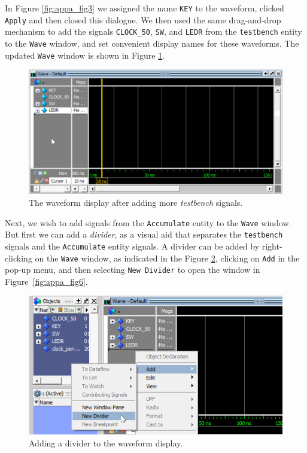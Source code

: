 \documentclass[11pt, twoside, pdftex]{article}
\begin{document}
\noindent
In Figure \ref{fig:appa_fig3} we assigned the name \texttt{KEY} to the waveform, clicked
\texttt{Apply} and then closed this dialogue. We then used the same drag-and-drop mechanism
to add the signals \texttt{CLOCK\_50}, \texttt{SW}, and \texttt{LEDR} from the
\texttt{testbench} entity to the \texttt{Wave} window, and set convenient display names 
for these waveforms. The updated \texttt{Wave} window is shown in Figure \ref{fig:appa_fig4}.

\begin{figure}[h!]
	\begin{center}
		\includegraphics[width = \textwidth]{figures/appa_fig4.png}
	\end{center}
	\caption{The waveform display after adding more {\it testbench} signals.}
	\label{fig:appa_fig4}
\end{figure}

\noindent
Next, we wish to add signals from the \texttt{Accumulate} entity to the \texttt{Wave} window. 
But first we can add a {\it divider}, as a visual aid that separates the \texttt{testbench} 
signals and the \texttt{Accumulate} entity signals. A divider can be added by
right-clicking on the \texttt{Wave} window, as indicated in the Figure \ref{fig:appa_fig5}, 
clicking on \texttt{Add} in the pop-up menu, and then selecting \texttt{New Divider} to 
open the window in Figure~\ref{fig:appa_fig6}. 

\begin{figure}[h!]
	\begin{center}
		\includegraphics[]{figures/appa_fig5.png}
	\end{center}
		  \caption{Adding a divider to the waveform display.}
	\label{fig:appa_fig5}
\end{figure}
\end{document}
